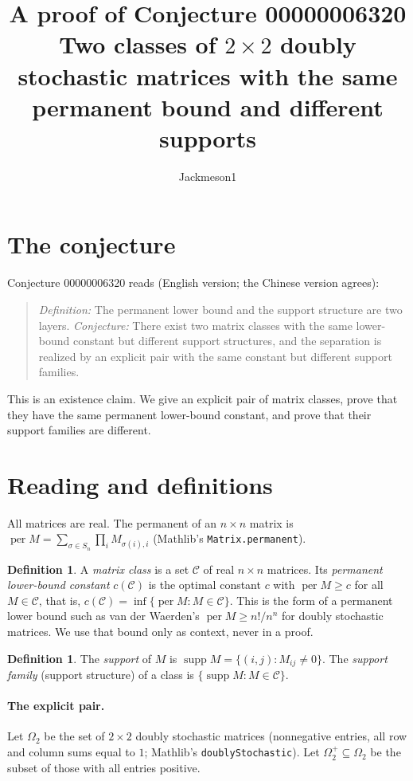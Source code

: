 \documentclass[11pt]{article}
\title{A proof of Conjecture 00000006320\\[2pt]
\large Two classes of $2\times 2$ doubly stochastic matrices with the same permanent bound and different supports}
\author{Jackmeson1}
\date{}
\theoremstyle{definition}
\newtheorem{definition}[theorem]{Definition}
\theoremstyle{remark}
\renewcommand{\_}{\oldus\allowbreak}
\newcommand{\per}{\operatorname{per}}
\newcommand{\supp}{\operatorname{supp}}
\begin{document}
\sloppy
\maketitle

\section{The conjecture}

Conjecture 00000006320 reads (English version; the Chinese version agrees):

\begin{quote}
\emph{Definition:} The permanent lower bound and the support structure are two layers.
\emph{Conjecture:} There exist two matrix classes with the same lower-bound constant but different
support structures, and the separation is realized by an explicit pair with the same constant but
different support families.
\end{quote}

This is an existence claim. We give an explicit pair of matrix classes, prove that they have the
same permanent lower-bound constant, and prove that their support families are different.

\section{Reading and definitions}

All matrices are real. The permanent of an $n\times n$ matrix is
$\per M=\sum_{\sigma\in S_n}\prod_i M_{\sigma(i),i}$ (Mathlib's \texttt{Matrix.permanent}).

\begin{definition}
A \emph{matrix class} is a set $\mathcal{C}$ of real $n\times n$ matrices. Its \emph{permanent
lower-bound constant} $c(\mathcal{C})$ is the optimal constant $c$ with $\per M\ge c$ for all
$M\in\mathcal{C}$, that is, $c(\mathcal{C})=\inf\{\per M: M\in\mathcal{C}\}$. This is the form of
a permanent lower bound such as van der Waerden's $\per M\ge n!/n^n$ for doubly stochastic
matrices. We use that bound only as context, never in a proof.
\end{definition}

\begin{definition}
The \emph{support} of $M$ is $\supp M=\{(i,j): M_{ij}\neq 0\}$. The \emph{support family} (support
structure) of a class is $\{\supp M: M\in\mathcal{C}\}$.
\end{definition}

\paragraph{The explicit pair.} Let $\Omega_2$ be the set of $2\times2$ doubly stochastic matrices
(nonnegative entries, all row and column sums equal to $1$; Mathlib's \texttt{doublyStochastic}).
Let $\Omega_2^{+}\subseteq\Omega_2$ be the subset of those with all entries positive.
\end{document}
